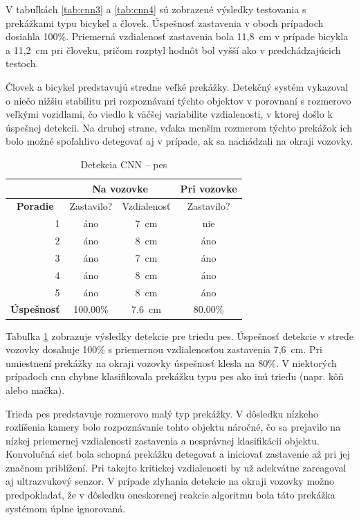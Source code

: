 V tabuľkách \ref{tab:cnn3} a \ref{tab:cnn4} sú zobrazené výsledky testovania s prekážkami typu bicykel a človek. Úspešnosť zastavenia v oboch prípadoch dosiahla 100\%. Priemerná vzdialenosť zastavenia bola 11,8~cm v prípade bicykla a 11,2~cm pri človeku, pričom rozptyl hodnôt bol vyšší ako v predchádzajúcich testoch.\par
Človek a bicykel predstavujú stredne veľké prekážky. Detekčný systém vykazoval o niečo nižšiu stabilitu pri rozpoznávaní týchto objektov v porovnaní s rozmerovo veľkými vozidlami, čo viedlo k väčšej variabilite vzdialenosti, v ktorej došlo k úspešnej detekcii. Na druhej strane, vďaka menším rozmerom týchto prekážok ich bolo možné spoľahlivo detegovať aj v prípade, ak sa nachádzali na okraji vozovky.\par
\begin{table}[!ht]
\caption{Detekcia CNN -- pes}
\label{tab:cnn5}
\centering
\begin{tabular}{|l r|c|c|c|}
        \hline
        \multicolumn{2}{|c|}{} & \multicolumn{2}{c|}{Na vozovke} & Pri vozovke \\ \hline
        \multicolumn{2}{|c|}{\textbf{Poradie}} & Zastavilo? & Vzdialenosť & Zastavilo? \\ \hline
        & 1 & áno & 7~cm & nie \\ \hline
        & 2 & áno & 8~cm & áno \\ \hline
        & 3 & áno & 7~cm & áno \\ \hline
        & 4 & áno & 8~cm & áno \\ \hline
        & 5 & áno & 8~cm & áno \\ \hline
        \multicolumn{2}{|l|}{\textbf{Úspešnosť}} & 100.00\% & 7.6~cm & 80.00\% \\ \hline
\end{tabular}
\end{table}
Tabuľka \ref{tab:cnn5} zobrazuje výsledky detekcie pre triedu pes. Úspešnosť detekcie v strede vozovky dosahuje 100\% s priemernou vzdialenosťou zastavenia 7,6~cm. Pri umiestnení prekážky na okraji vozovky úspešnosť klesla na 80\%. V niektorých prípadoch \acrshort{cnn} chybne klasifikovala prekážku typu pes ako inú triedu (napr. kôň alebo mačka).\par
Trieda pes predstavuje rozmerovo malý typ prekážky. V dôsledku nízkeho rozlíšenia kamery bolo rozpoznávanie tohto objektu náročné, čo sa prejavilo na nízkej priemernej vzdialenosti zastavenia a nesprávnej klasifikácii objektu. Konvolučná sieť bola schopná prekážku detegovať a iniciovať zastavenie až pri jej značnom priblížení. Pri takejto kritickej vzdialenosti by už adekvátne zareagoval aj ultrazvukový senzor. V prípade zlyhania detekcie na okraji vozovky možno predpokladať, že v dôsledku oneskorenej reakcie algoritmu bola táto prekážka systémom úplne ignorovaná.\par
